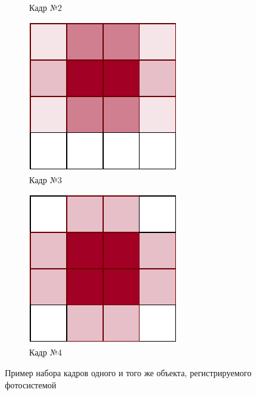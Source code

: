 \begin{figure}[h!]
\begin{subfigure}{0.17\textwidth}
        \caption{Кадр №2}
    \end{subfigure}
    \begin{subfigure}{0.17\textwidth}
        \centering
        \includegraphics[width=\textwidth]{assets/r3.pdf}
        \caption{Кадр №3}
    \end{subfigure}
    \begin{subfigure}{0.17\textwidth}
        \centering
        \includegraphics[width=\textwidth]{assets/r4.pdf}
        \caption{Кадр №4}
    \end{subfigure}
    \caption{Пример набора кадров одного и того же объекта, регистрируемого фотосистемой}
    \label{circles}
\end{figure}

